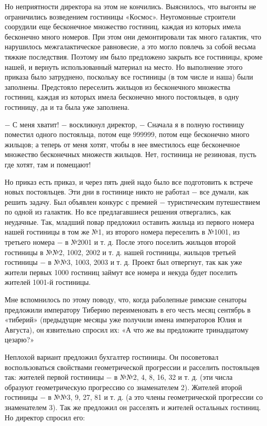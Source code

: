 \documentclass{article}
\begin{document}
Но неприятности директора на этом не кончились. Выяснилось, что выгонты не ограничились возведением гостиницы «Космос». Неугомонные строители соорудили еще бесконечное множество гостиниц, каждая из которых имела бесконечно много номеров. При этом они демонтировали так много галактик, что нарушилось межгалактическое равновесие, а это могло повлечь за собой весьма тяжкие последствия. Поэтому им было предложено закрыть все гостиницы, кроме нашей, и вернуть использованный материал на место. Но выполнение этого приказа было затруднено, поскольку все гостиницы (в том числе и наша) были заполнены. Предстояло переселить жильцов из бесконечного множества гостиниц, каждая из которых имела бесконечно много постояльцев, в одну гостиницу, да и та была уже заполнена.

\(-\) С меня хватит! \(-\) воскликнул директор, \(-\) Сначала я в полную гостиницу поместил одного постояльца, потом еще 999999, потом еще бесконечно много жильцов; а теперь от меня хотят, чтобы в нее вместилось еще бесконечное множество бесконечных множеств жильцов. Нет, гостиница не резиновая, пусть где хотят, там и помещают!

Но приказ есть приказ, и через пять дней надо было все подготовить к встрече новых постояльцев. Эти дни в гостинице никто не работал \(-\) все думали, как решить задачу. Был объявлен конкурс с премией \(-\) туристическим путешествием по одной из галактик. Но все предлагавшиеся решения отвергались, как неудачные. Так, младший повар предложил оставить жильца из первого номера нашей гостиницы в том же №1, из второго номера переселить в №1001, из третьего номера \(-\) в №2001 и т. д. После этого поселить жильцов второй гостиницы в №№2, 1002, 2002 и т. д. нашей гостиницы, жильцов третьей гостиницы \(-\) в №№3, 1003, 2003 и т. д. Проект был отвергнут, так как уже жители первых 1000 гостиниц займут все номера и некуда будет поселить жителей 1001-й гостиницы.

Мне вспомнилось по этому поводу, что, когда раболепные римские сенаторы предложили императору Тиберию переименовать в его честь месяц сентябрь в «тиберий» (предыдущие месяцы уже получили имена императоров Юлия и Августа), он язвительно спросил их: «А что же вы предложите тринадцатому цезарю?»

Неплохой вариант предложил бухгалтер гостиницы. Он посоветовал воспользоваться свойствами геометрической прогрессии и расселить постояльцев так: жителей первой гостиницы \(-\) в №№2, 4, 8, 16, 32 и т. д. (эти числа образуют геометрическую прогрессию со знаменателем 2). Жителей второй гостиницы \(-\) в №№3, 9, 27, 81 и т. д. (а это члены геометрической прогрессии со знаменателем 3). Так же предложил он расселять и жителей остальных гостиниц. Но директор спросил его:
\end{document}
